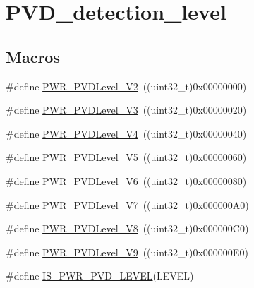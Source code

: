 \hypertarget{group___p_v_d__detection__level}{}\section{P\+V\+D\+\_\+detection\+\_\+level}
\label{group___p_v_d__detection__level}
\subsection*{Macros}
\begin{DoxyCompactItemize}
\item 
\#define \mbox{\hyperlink{group___p_v_d__detection__level_ga5cf8b09ed099c7412fcee6ccec2ec20b}{P\+W\+R\+\_\+\+P\+V\+D\+Level\+\_\+V2}}~((uint32\+\_\+t)0x00000000)
\item 
\#define \mbox{\hyperlink{group___p_v_d__detection__level_ga561e543dedb4c2cb126ec8d9d604260c}{P\+W\+R\+\_\+\+P\+V\+D\+Level\+\_\+V3}}~((uint32\+\_\+t)0x00000020)
\item 
\#define \mbox{\hyperlink{group___p_v_d__detection__level_ga5b585e7e6eda29e8b119e16779ba7a8b}{P\+W\+R\+\_\+\+P\+V\+D\+Level\+\_\+V4}}~((uint32\+\_\+t)0x00000040)
\item 
\#define \mbox{\hyperlink{group___p_v_d__detection__level_gad91e74c3034a5baccca70250815e680e}{P\+W\+R\+\_\+\+P\+V\+D\+Level\+\_\+V5}}~((uint32\+\_\+t)0x00000060)
\item 
\#define \mbox{\hyperlink{group___p_v_d__detection__level_ga46174e5288082b59473068a3ca8e8ea6}{P\+W\+R\+\_\+\+P\+V\+D\+Level\+\_\+V6}}~((uint32\+\_\+t)0x00000080)
\item 
\#define \mbox{\hyperlink{group___p_v_d__detection__level_ga72d22a858d8289ef02fff45f4810b916}{P\+W\+R\+\_\+\+P\+V\+D\+Level\+\_\+V7}}~((uint32\+\_\+t)0x000000\+A0)
\item 
\#define \mbox{\hyperlink{group___p_v_d__detection__level_ga5f38835a95c026b1db16dbebf81b45a2}{P\+W\+R\+\_\+\+P\+V\+D\+Level\+\_\+V8}}~((uint32\+\_\+t)0x000000\+C0)
\item 
\#define \mbox{\hyperlink{group___p_v_d__detection__level_ga9c156a7155f9946c0d3a73794f51a1ce}{P\+W\+R\+\_\+\+P\+V\+D\+Level\+\_\+V9}}~((uint32\+\_\+t)0x000000\+E0)
\item 
\#define \mbox{\hyperlink{group___p_v_d__detection__level_gabac4485a57abc97aad91eaa0b65ae927}{I\+S\+\_\+\+P\+W\+R\+\_\+\+P\+V\+D\+\_\+\+L\+E\+V\+EL}}(L\+E\+V\+EL)
\end{DoxyCompactItemize}


